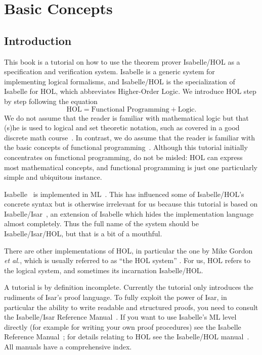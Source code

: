 \chapter{Basic Concepts}

\section{Introduction}

This book is a tutorial on how to use the theorem prover Isabelle/HOL as a
specification and verification system. Isabelle is a generic system for
implementing logical formalisms, and Isabelle/HOL is the specialization
of Isabelle for HOL, which abbreviates Higher-Order Logic. We introduce
HOL step by step following the equation
\[ \mbox{HOL} = \mbox{Functional Programming} + \mbox{Logic}. \]
We do not assume that the reader is familiar with mathematical logic but that
(s)he is used to logical and set theoretic notation, such as covered
in a good discrete math course~\cite{Rosen-DMA}. In contrast, we do assume
that the reader is familiar with the basic concepts of functional
programming~\cite{Bird-Haskell,Hudak-Haskell,paulson-ml2,Thompson-Haskell}.
Although this tutorial initially concentrates on functional programming, do
not be misled: HOL can express most mathematical concepts, and functional
programming is just one particularly simple and ubiquitous instance.

Isabelle~\cite{paulson-isa-book} is implemented in ML~\cite{SML}.  This has
influenced some of Isabelle/HOL's concrete syntax but is otherwise irrelevant
for us because this tutorial is based on
Isabelle/Isar~\cite{isabelle-isar-ref}, an extension of Isabelle which hides
the implementation language almost completely.  Thus the full name of the
system should be Isabelle/Isar/HOL, but that is a bit of a mouthful.

There are other implementations of HOL, in particular the one by Mike Gordon
\emph{et al.}, which is usually referred to as ``the HOL system''
\cite{mgordon-hol}. For us, HOL refers to the logical system, and sometimes
its incarnation Isabelle/HOL.

A tutorial is by definition incomplete.  Currently the tutorial only
introduces the rudiments of Isar's proof language. To fully exploit the power
of Isar, in particular the ability to write readable and structured proofs,
you need to consult the Isabelle/Isar Reference
Manual~\cite{isabelle-isar-ref}. If you want to use Isabelle's ML level
directly (for example for writing your own proof procedures) see the Isabelle
Reference Manual~\cite{isabelle-ref}; for details relating to HOL see the
Isabelle/HOL manual~\cite{isabelle-HOL}. All manuals have a comprehensive
index.

